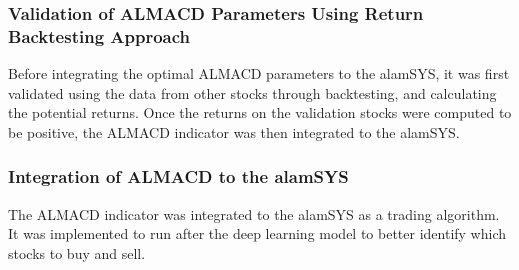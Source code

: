 

\subsubsection{Validation of ALMACD Parameters Using Return Backtesting Approach}
\label{subsubsec:almacd_validation}
Before integrating the optimal ALMACD parameters to the alamSYS, it was
first validated using the data from other stocks through backtesting, 
and calculating the potential returns. Once the
returns on the validation stocks were computed to be positive,
the ALMACD indicator was then integrated to the alamSYS.


\subsubsection{Integration of ALMACD to the alamSYS}
\label{subsubsec:almacd_integration}
The ALMACD indicator was integrated to the alamSYS as a trading
algorithm. It was implemented to run after the deep learning model
to better identify which stocks to buy and sell.